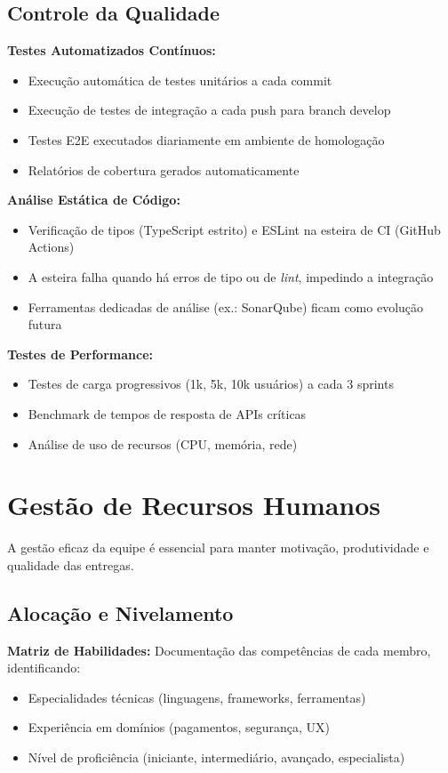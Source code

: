\subsection{Controle da Qualidade}

\textbf{Testes Automatizados Contínuos:}
\begin{itemize}
    \item Execução automática de testes unitários a cada commit
    \item Execução de testes de integração a cada push para branch develop
    \item Testes E2E executados diariamente em ambiente de homologação
    \item Relatórios de cobertura gerados automaticamente
\end{itemize}

\textbf{Análise Estática de Código:}
\begin{itemize}
    \item Verificação de tipos (TypeScript estrito) e ESLint na esteira de CI (GitHub Actions)
    \item A esteira falha quando há erros de tipo ou de \textit{lint}, impedindo a integração
    \item Ferramentas dedicadas de análise (ex.: SonarQube) ficam como evolução futura
\end{itemize}

\textbf{Testes de Performance:}
\begin{itemize}
    \item Testes de carga progressivos (1k, 5k, 10k usuários) a cada 3 sprints
    \item Benchmark de tempos de resposta de APIs críticas
    \item Análise de uso de recursos (CPU, memória, rede)
\end{itemize}

\section{Gestão de Recursos Humanos}

A gestão eficaz da equipe é essencial para manter motivação, produtividade e qualidade das entregas.

\subsection{Alocação e Nivelamento}

\textbf{Matriz de Habilidades:} Documentação das competências de cada membro, identificando:
\begin{itemize}
    \item Especialidades técnicas (linguagens, frameworks, ferramentas)
    \item Experiência em domínios (pagamentos, segurança, UX)
    \item Nível de proficiência (iniciante, intermediário, avançado, especialista)
\end{itemize}


